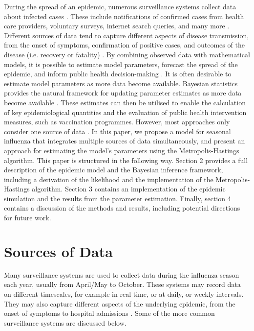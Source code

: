 
During the spread of an epidemic, numerous surveillance systems collect data about infected cases \cite{Thomas et al 2015}. These include notifications of confirmed cases from health care providers, voluntary surveys, internet search queries, and many more \cite{}. Different sources of data tend to capture different aspects of disease transmission, from the onset of symptoms, confirmation of positive cases, and outcomes of the disease (i.e. recovery or fatality) \cite{Moss et al 2016}.
By combining observed data with mathematical models, it is possible to estimate model parameters, forecast the spread of the epidemic, and inform public health decision-making \cite{Keeling Rohani 2007, Held 2020}.
It is often desirable to estimate model parameters as more data become available. Bayesian statistics provides the natural framework for updating parameter estimates as more data become available \cite{Spiegelhalter 2019}. These estimates can then be utilised to enable the calculation of key epidemiological quantities and the evaluation of public health intervention measures, such as vaccination programmes. However, most approaches only consider one source of data \cite{Ross et al 2010}.
In this paper, we propose a model for seasonal influenza that integrates multiple sources of data simultaneously, and present an approach for estimating the model's parameters using the Metropolis-Hastings algorithm.
This paper is structured in the following way. Section 2 provides a full description of the epidemic model and the Bayesian inference framework, including a derivation of the likelihood and the implementation of the Metropolis-Hastings algorithm. Section 3 contains an implementation of the epidemic simulation and the results from the parameter estimation. Finally, section 4 contains a discussion of the methods and results, including potential directions for future work.

\section{Sources of Data} 
Many surveillance systems are used to collect data during the influenza season each year, usually from April/May to October. These systems may record data on different timescales, for example in real-time, or at daily, or weekly intervals. They may also capture different aspects of the underlying epidemic, from the onset of symptoms to hospital admissions \cite{Thomas et al 2015, Moss et al 2016}. Some of the more common surveillance systems are discussed below.

